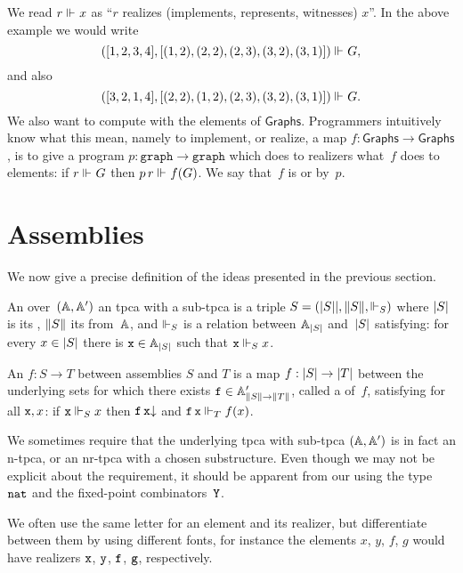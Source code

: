 %
We read $r \rz x$ as ``$r$ realizes (implements, represents, witnesses) $x$''. In the above example we would write
%
\begin{equation*}
([1, 2, 3, 4], [(1,2), (2,2), (2,3), (3,2), (3,1)]) \rz G,
\end{equation*}
%
and also
%
\begin{equation*}
([3, 2, 1, 4], [(2,2), (1,2), (2,3), (3,2), (3,1)]) \rz G.
\end{equation*}
%
We also want to compute with the elements of $\mathsf{Graphs}$.
%
Programmers intuitively know what this mean, namely to implement, or realize, a map $f : \mathsf{Graphs} \to \mathsf{Graphs}$, is to give a program $p : \mathtt{graph} \to \mathtt{graph}$ which does to realizers what~$f$ does to elements: if $r \rz G$ then $p \, r \rz f(G)$. We say that~$f$ is  or  by~$p$.

\section{Assemblies}
\label{sec:assemblies}

We now give a precise definition of the ideas presented in the previous section.

\begin{definition}
  An  over~$(\AA, \subAA)$ an tpca with a sub-tpca is a triple
  $S = \xasm{S}$ where $\S{S}$ is its , $\T{S}$ its  from~$\AA$, and $\rz[S]$ is a relation between $\xAtyp{S}$ and~$\S{S}$
  satisfying: for every $x \in \S{S}$ there is $\R{x} \in \xAtyp{S}$ such that $\R{x} \rz[S] x$.

  An  $f : S \to T$ between assemblies $S$ and $T$ is a map $f : \S{S} \to \S{T}$
  between the underlying sets for which there exists $\R{f} \in \subAtyp{\T{S} \to \T{T}}$, called a 
  of~$f$, satisfying for all $\R{x}, x$: if $\R{x} \rz[S] x$ then $\defined{\R{f} \, \R{x}}$ and $\R{f} \, \R{x} \rz[T] f(x)$.
\end{definition}

\noindent
%
We sometimes require that the underlying tpca with sub-tpca $(\AA, \subAA)$ is in fact an n-tpca, or an nr-tpca with a chosen substructure. Even though we may not be explicit about the requirement, it should be apparent from our using the type~$\ttnat$ and the fixed-point combinators~$\combY$.

We often use the same letter for an element and its realizer, but differentiate between them by using different fonts, for instance the elements $x$, $y$, $f$, $g$ would have realizers $\R{x}$, $\R{y}$, $\R{f}$, $\R{g}$, respectively.

